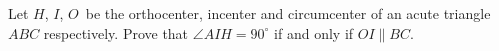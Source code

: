 \problem
Let $H$, $I$, $O$~be the orthocenter, incenter and circumcenter of an acute
triangle $ABC$ respectively.
Prove that $\angle AIH = 90^\circ$ if and only if $OI \parallel BC$.
\solution
\endproblem
